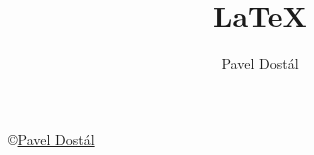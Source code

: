 \documentclass{article}
\title{LaTeX}
\author{Pavel Dostál}
\begin{document}
	\pagestyle{empty}
	\begin{multicols}{2}
		
		
		
	\columnbreak
		
		
		
		
	\end{multicols}
\pagebreak
	
	
\pagebreak
	
	\begin{multicols}{2}
		\copyright \href{http://pdostal.cz/}{Pavel Dostál}
	\columnbreak
		
		
	\end{multicols}
\end{document}

